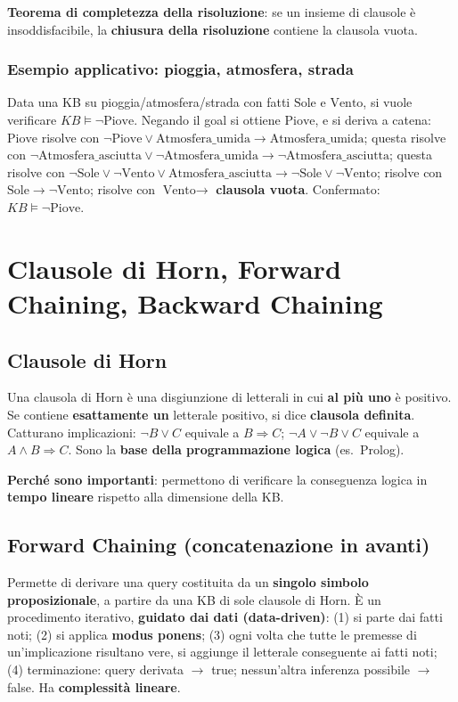 \documentclass[11pt,a4paper]{report}
\begin{document}
\textbf{Teorema di completezza della risoluzione}: se un insieme di clausole è insoddisfacibile, la \textbf{chiusura della risoluzione} contiene la clausola vuota.

\subsubsection*{Esempio applicativo: pioggia, atmosfera, strada}

Data una KB su pioggia/atmosfera/strada con fatti $\text{Sole}$ e $\text{Vento}$, si vuole verificare $KB \models \neg\text{Piove}$. Negando il goal si ottiene $\text{Piove}$, e si deriva a catena: $\text{Piove}$ risolve con $\neg\text{Piove}\vee\text{Atmosfera\_umida} \to \text{Atmosfera\_umida}$; questa risolve con $\neg\text{Atmosfera\_asciutta}\vee\neg\text{Atmosfera\_umida} \to \neg\text{Atmosfera\_asciutta}$; questa risolve con $\neg\text{Sole}\vee\neg\text{Vento}\vee\text{Atmosfera\_asciutta} \to \neg\text{Sole}\vee\neg\text{Vento}$; risolve con $\text{Sole} \to \neg\text{Vento}$; risolve con $\text{Vento} \to$ \textbf{clausola vuota}. Confermato: $KB \models \neg\text{Piove}$.

\section{Clausole di Horn, Forward Chaining, Backward Chaining}

\subsection*{Clausole di Horn}

Una clausola di Horn è una disgiunzione di letterali in cui \textbf{al più uno} è positivo. Se contiene \textbf{esattamente un} letterale positivo, si dice \textbf{clausola definita}. Catturano implicazioni: $\neg B\vee C$ equivale a $B\Rightarrow C$; $\neg A\vee\neg B\vee C$ equivale a $A\wedge B\Rightarrow C$. Sono la \textbf{base della programmazione logica} (es.\ Prolog).

\textbf{Perché sono importanti}: permettono di verificare la conseguenza logica in \textbf{tempo lineare} rispetto alla dimensione della KB.

\subsection*{Forward Chaining (concatenazione in avanti)}

Permette di derivare una query costituita da un \textbf{singolo simbolo proposizionale}, a partire da una KB di sole clausole di Horn. È un procedimento iterativo, \textbf{guidato dai dati (data-driven)}: (1) si parte dai fatti noti; (2) si applica \textbf{modus ponens}; (3) ogni volta che tutte le premesse di un'implicazione risultano vere, si aggiunge il letterale conseguente ai fatti noti; (4) terminazione: query derivata $\to$ true; nessun'altra inferenza possibile $\to$ false. Ha \textbf{complessità lineare}.
\end{document}
